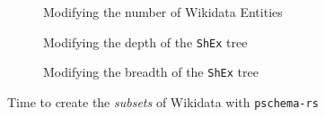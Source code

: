 \begin{figure}[p]
    \begin{subfigure}{\textwidth}
        \centering
        
        \caption{Modifying the number of Wikidata Entities}
    \end{subfigure}%
    \vspace*{1em}
    \begin{subfigure}{\textwidth}
        \centering
        
        \caption{Modifying the depth of the \texttt{ShEx} tree}
    \end{subfigure}%
    \vspace*{1em}
    \begin{subfigure}{\textwidth}
        \centering
        
        \caption{Modifying the breadth of the \texttt{ShEx} tree}
    \end{subfigure}
    \caption{Time to create the \textit{subsets} of Wikidata with \texttt{pschema-rs}}
\end{figure}